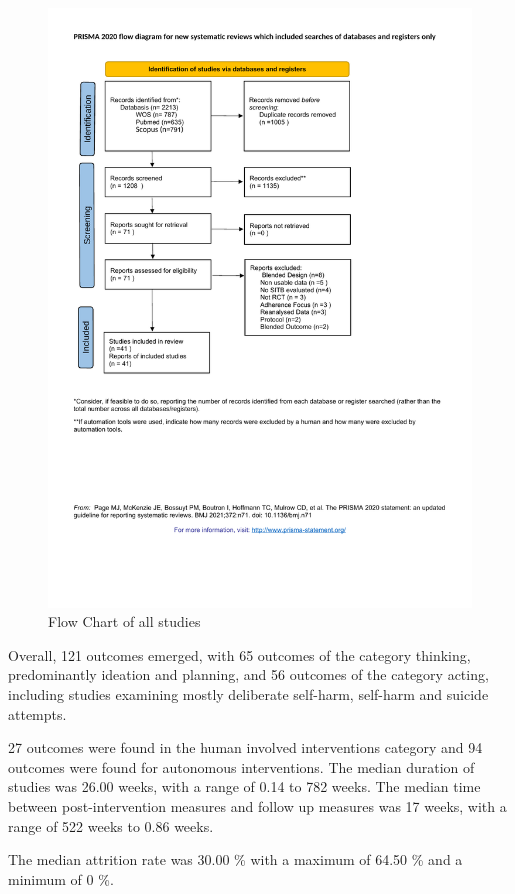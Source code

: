 \documentclass[
  english,
  man]{apa6}
\begin{document}
\begin{figure}
\centering
\includegraphics{01_Plots/DBI_Flow_Chart.pdf}
\caption{Flow Chart of all studies}
\end{figure}

Overall, 121 outcomes emerged, with 65 outcomes of the category thinking, predominantly ideation and planning, and 56 outcomes of the category acting, including studies examining mostly deliberate self-harm, self-harm and suicide attempts.

27 outcomes were found in the human involved interventions category and 94 outcomes were found for autonomous interventions. The median duration of studies was 26.00 weeks, with a range of 0.14 to 782 weeks. The median time between post-intervention measures and follow up measures was 17 weeks, with a range of 522 weeks to 0.86 weeks.

The median attrition rate was 30.00 \% with a maximum of 64.50 \% and a minimum of 0 \%.\\
\end{document}
